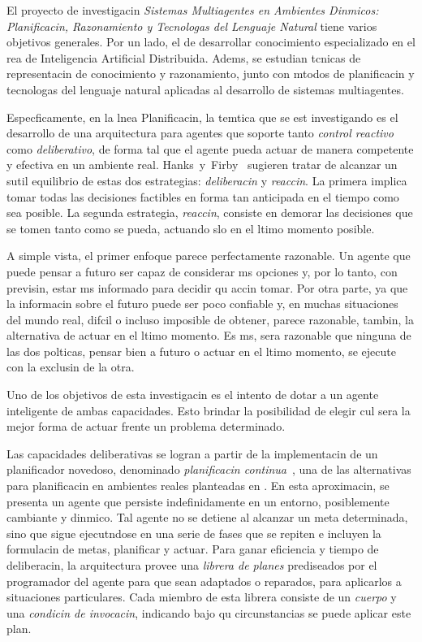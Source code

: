 \documentclass[a4paper,12pt,twocolumn]{article}
\begin{document}
El proyecto de investigacin 
\emph{Sistemas Multiagentes en Ambientes Dinmicos: Planificacin, Razonamiento y Tecnologas del Lenguaje Natural} tiene varios objetivos generales. Por un lado, el de desarrollar conocimiento especializado en el rea de Inteligencia Artificial Distribuida. Adems,
se estudian tcnicas de representacin de conocimiento y razonamiento, junto con mtodos de planificacin\cite{gnt:ap,znk07} y tecnologas del lenguaje natural aplicadas al desarrollo de sistemas multiagentes.

Especficamente, en la lnea Planificacin,
la temtica que se est investigando es el desarrollo de una
arquitectura para agentes que soporte tanto \emph{control reactivo}
como \emph{deliberativo}, de forma tal que el agente pueda actuar de
manera competente y efectiva en un am\-bien\-te real. \mbox{Hanks y
  Firby~\cite{hanks90:_issues_in_archit_for_plann_and_execut}}
su\-gie\-ren tratar de alcanzar un sutil equilibrio de estas dos estrategias:
\emph{deliberacin} y \emph{reaccin}.
La primera implica tomar todas las decisiones
factibles en forma tan anticipada en el tiempo como sea posible. La segunda
estrategia, \emph{reaccin}, consiste en demorar las decisiones que se tomen
tanto como se pueda, actuando slo en el ltimo momento posible.

A simple vista, el primer enfoque parece perfectamente razonable.
Un agente que puede pensar a futuro ser capaz de
considerar ms opciones y, por lo tanto, con previsin, estar ms
informado para decidir qu accin tomar.  Por otra parte, ya que la
informacin sobre el futuro puede ser poco confiable y, en muchas
situaciones del mundo real, difcil o incluso imposible de obtener,
parece razonable, tambin,  la alternativa de actuar en el ltimo momento.  Es ms,
sera razonable que ninguna de las dos polticas, pensar bien a futuro o
actuar en el ltimo momento, se ejecute con la exclusin de la otra.

Uno de los objetivos de esta investigacin es el intento de dotar a un agente inteligente
de ambas capacidades. Esto brindar la posibilidad de elegir cul sera
la mejor forma de actuar frente un problema determinado. 

Las capacidades deliberativas se logran a partir de la implementacin
de un planificador novedoso, denominado \emph{planificacin
  continua}~\cite{moya09:_agent_delib_basad_en_contin}, una de las
alternativas para pla\-ni\-fi\-ca\-cin en ambientes reales planteadas en
\cite{Rus09}.  En esta aproximacin, se presenta un
agente que persiste indefinidamente en un entorno, posiblemente cambiante
y dinmico.
Tal agente no se
detiene al alcanzar un meta determinada, sino que sigue ejecutndose
en una serie de fa\-ses que se repiten e incluyen la formulacin de
metas, planificar y actuar. Para ganar eficiencia y tiempo de
deliberacin, la arquitectura provee una \emph{librera de planes}
prediseados por el programador del agente para que sean adaptados o
reparados, para aplicarlos a situaciones particulares. Cada miembro de esta 
li\-bre\-ra
consiste de un \emph{cuerpo} y una \emph{condicin de invocacin},
indicando bajo qu circunstancias se puede aplicar este plan.
\end{document}
